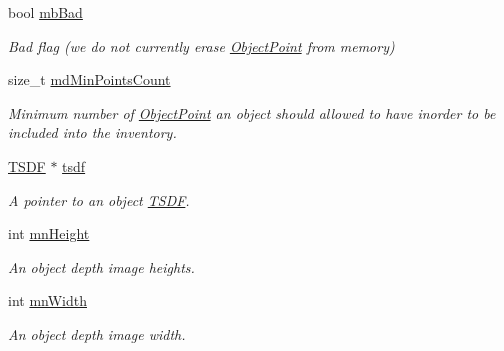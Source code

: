 \begin{DoxyCompactItemize}
\mbox{\label{classObject_a8c4672ce0a21fe301c5f11419bda84d0}} 
bool \hyperlink{classObject_a8c4672ce0a21fe301c5f11419bda84d0}{mb\+Bad}
\begin{DoxyCompactList}\small\item\em Bad flag (we do not currently erase \hyperlink{classObjectPoint}{Object\+Point} from memory) \end{DoxyCompactList}\item 
\mbox{\label{classObject_a4cc6b61d250e200e2ec5eeccc1745b79}} 
size\+\_\+t \hyperlink{classObject_a4cc6b61d250e200e2ec5eeccc1745b79}{md\+Min\+Points\+Count}
\begin{DoxyCompactList}\small\item\em Minimum number of \hyperlink{classObjectPoint}{Object\+Point} an object should allowed to have inorder to be included into the inventory. \end{DoxyCompactList}\item 
\mbox{\label{classObject_af7eada6b6f8f5c6d7c52ba96f9c6b0d2}} 
\hyperlink{classTSDF}{T\+S\+DF} $\ast$ \hyperlink{classObject_af7eada6b6f8f5c6d7c52ba96f9c6b0d2}{tsdf}
\begin{DoxyCompactList}\small\item\em A pointer to an object \hyperlink{classTSDF}{T\+S\+DF}. \end{DoxyCompactList}\item 
\mbox{\label{classObject_a6d8dfe87d2bbcb734681939b0c54aa86}} 
int \hyperlink{classObject_a6d8dfe87d2bbcb734681939b0c54aa86}{mn\+Height}
\begin{DoxyCompactList}\small\item\em An object depth image heights. \end{DoxyCompactList}\item 
\mbox{\label{classObject_a32d2930a06f611ed2a7cbff167736eeb}} 
int \hyperlink{classObject_a32d2930a06f611ed2a7cbff167736eeb}{mn\+Width}
\begin{DoxyCompactList}\small\item\em An object depth image width. \end{DoxyCompactList}\item 
\mbox{\label{classObject_a98a79df663772f156d9dcb10f5de3dfe}} 

\end{DoxyCompactItemize}
